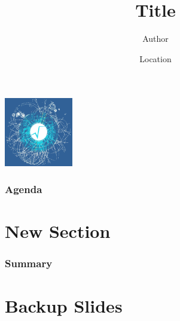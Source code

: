 \documentclass[final, hyperref={pdfpagemode=FullScreen}, aspectratio=169]{beamer}
\title[name@cern.ch]{Title}
\author{Author}
\date[Short Title]{Location}
\begin{document}

{
\begin{frame}[plain,noframenumbering,label=titlepage]
	\centering
  \vspace{0.75cm}
  \includegraphics[width=3cm]{img/root-splash}
  \vspace{-1.75cm}

	\titlepage
\end{frame}
}

\begin{frame}
  \frametitle{Agenda}
  \footnotesize

  \tableofcontents
\end{frame}

\section{New Section}

\begin{frame}
  \frametitle{Summary}
  \footnotesize
\end{frame}


\appendix
\beginbackup
\section{Backup Slides}

\backupend
\end{document}

